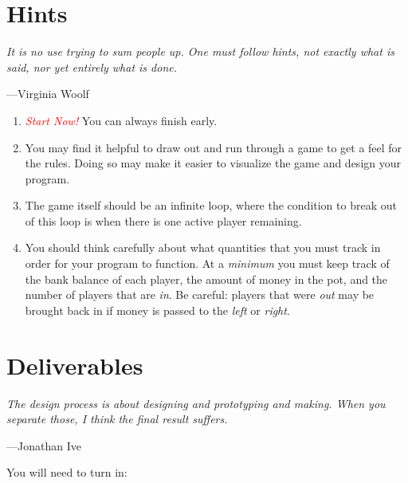 \documentclass{article}
\begin{document}
\section{Hints}
\epigraph{\emph{It is no use trying to sum people up. One must follow hints,
not exactly what is said, nor yet entirely what is done.}}{---Virginia Woolf}

\begin{enumerate}

\item \emph{\textcolor{red}{Start Now!}} You can always finish early.

\item You may find it helpful to draw out and run through a game to get a feel
    for the rules. Doing so may make it easier to visualize the game and design
    your program.
\item The game itself should be an infinite loop, where the condition to break
    out of this loop is when there is one active player remaining.
\item You should think carefully about what quantities that you
must track in order for your program to function. At a \emph{minimum}
you must keep track of the bank balance of each player, the amount
of money in the pot, and the number of players that are \emph{in}.
Be careful: players that were \emph{out} may be brought back in if
money is passed to the \emph{left} or \emph{right}.

\end{enumerate}


\section{Deliverables}
\epigraph{\emph{The design process is about designing and prototyping and
making. When you separate those, I think the final result
suffers.}}{---Jonathan Ive}

You will need to turn in:
\end{document}
